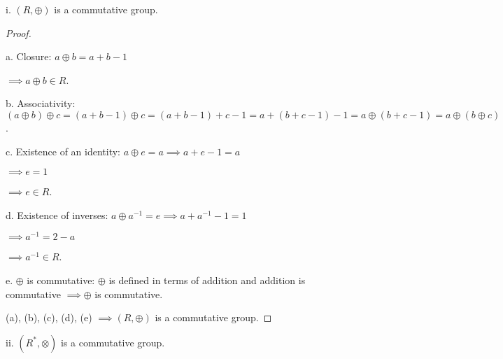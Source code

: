\documentclass{article}
\begin{document}
\noindent
i. $(R, \oplus)$ is a commutative group.

\begin{proof}
  $ $ 

  a. Closure: $a \oplus b = a + b - 1$

  $\implies a \oplus b \in R$.
  \newline

  b. Associativity: $(a \oplus b) \oplus c = (a+b-1) \oplus c = (a+b-1) + c -1 = a + (b + c -1) -1 = a \oplus (b + c - 1) = a \oplus (b \oplus c)$.
  \newline

  c. Existence of an identity: $a \oplus e = a \implies a + e - 1 = a$
  
  $\implies e = 1$

  $\implies e \in R$.
  \newline

  d. Existence of inverses: $a \oplus a^{-1} = e \implies a + a^{-1} - 1 = 1$
  
  $\implies a^{-1} = 2 - a$

  $\implies a^{-1} \in R$.
  \newline

  e. $\oplus$ is commutative: $\oplus$ is defined in terms of addition and addition is commutative $\implies \oplus$ is commutative.
  \newline

  (a), (b), (c), (d), (e) $\implies (R, \oplus)$ is a commutative group.
  \newline

\end{proof}

\noindent
ii. $(R^*, \otimes)$ is a commutative group.
\end{document}
